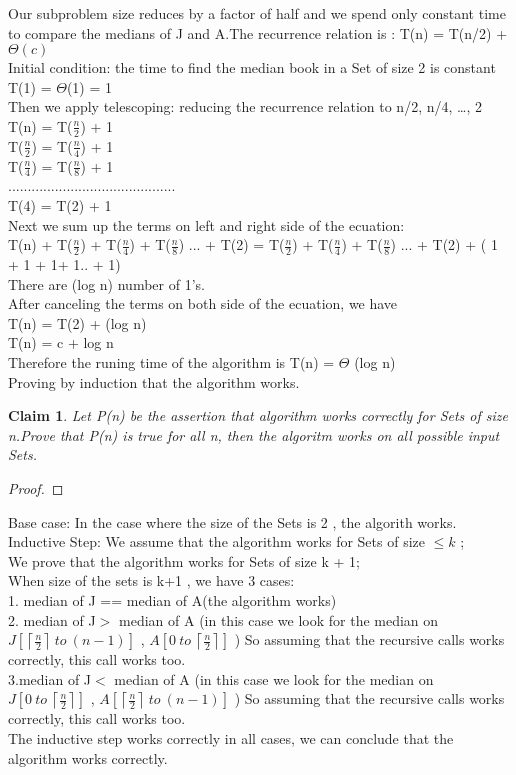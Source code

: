 \documentclass[11pt]{article}
\newtheorem{claim}[theorem]{Claim}
\begin{document}
 Our subproblem size reduces by a factor of half and we spend only constant time to compare the    medians of J and A.The recurrence relation is : T(n) = T(n/2) + $\Theta(c)$ \\
Initial condition: the time to find the median book in a Set of size 2 is constant\\
T(1) = $\Theta$(1) = 1\\
Then we apply telescoping: reducing the recurrence relation to  n/2, n/4,  …, 2\\
T(n) = T($\frac{n}{2}$) + 1\\
T($\frac{n}{2}$) = T($\frac{n}{4}$) + 1\\
T($\frac{n}{4}$) = T($\frac{n}{8}$) + 1\\
 ...........................................\\
T(4) = T(2) + 1\\

Next we sum up the terms on left and right side of the ecuation:\\
T(n) + T($\frac{n}{2}$) + T($\frac{n}{4}$) + T($\frac{n}{8}$) ... + T(2) = T($\frac{n}{2}$) + T($\frac{n}{4}$) + T($\frac{n}{8}$) ... + T(2) + ( 1 + 1 + 1+ 1.. + 1)\\
There are (log n) number of 1's.\\
After canceling the terms on both side of the ecuation, we have \\
T(n) =  T(2) + (log n)\\
T(n) = c + log n\\
Therefore the runing time of the algorithm is T(n) = $\Theta$ (log n)\\
Proving by induction that the algorithm works.
\begin{claim}
Let P(n) be the assertion that algorithm works correctly for Sets of size n.Prove that P(n) is true for all n, then the algoritm works on all possible input Sets.
\end{claim}
\begin {proof}

\end {proof}
Base case: In the case where the size of the Sets is 2 , the algorith works.\\
Inductive Step: We assume that the algorithm works for Sets of size  $\leq k$ ;\\
We prove that the algorithm works for Sets of size k + 1;\\
When size of the sets is k+1 , we have 3 cases:\\
1. median of J == median of A(the algorithm works)\\
2. median of J$>$ median of A (in this case we look for the median on $J[ \left \lceil{\frac{n}{2}}\right \rceil  \ to \ (n-1) ]$ ,  $A[ 0 \ to \  \left \lceil{\frac{n}{2}}\right \rceil  ]$ ) So assuming that the recursive calls works correctly, this call works too.\\
3.median of J$<$ median of A (in this case we look for the median on $J[ 0 \ to \ \left \lceil{\frac{n}{2}}\right \rceil]$ ,  $A[  \left \lceil{\frac{n}{2}}\right \rceil \ to \ (n-1) ]$  ) So assuming that the recursive calls works correctly, this call works too.\\
The inductive step works correctly in all cases, we can conclude that the algorithm works correctly.
\end{document}
